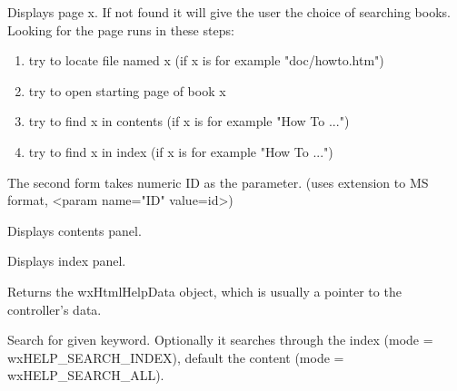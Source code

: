 
Displays page x. If not found it will give the user the choice of
searching books.
Looking for the page runs in these steps:

\begin{enumerate}\itemsep=0pt
\item try to locate file named x (if x is for example "doc/howto.htm")
\item try to open starting page of book x
\item try to find x in contents (if x is for example "How To ...")
\item try to find x in index (if x is for example "How To ...")
\end{enumerate}

The second form takes numeric ID as the parameter.
(uses extension to MS format, <param name="ID" value=id>)


\label{wxhtmlhelpwindowdisplaycontents}


Displays contents panel.

\label{wxhtmlhelpwindowdisplayindex}


Displays index panel.

\label{wxhtmlhelpwindowgetdata}


Returns the wxHtmlHelpData object, which is usually a pointer to the controller's data.

\label{wxhtmlhelpwindowkeywordsearch}


Search for given keyword. Optionally it searches through the index (mode =
wxHELP\_SEARCH\_INDEX), default the content (mode = wxHELP\_SEARCH\_ALL).

\label{wxhtmlhelpwindowreadcustomization}


